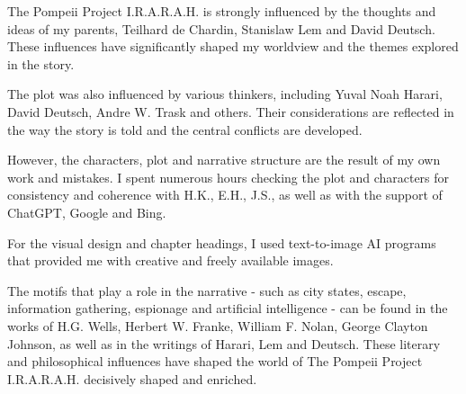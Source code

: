 \documentclass[
]{article}
\begin{document}
The Pompeii Project I.R.A.R.A.H. is strongly influenced by the thoughts
and ideas of my parents, Teilhard de Chardin, Stanislaw Lem and David
Deutsch. These influences have significantly shaped my worldview and the
themes explored in the story.

The plot was also influenced by various thinkers, including Yuval Noah
Harari, David Deutsch, Andre W. Trask and others. Their considerations
are reflected in the way the story is told and the central conflicts are
developed.

However, the characters, plot and narrative structure are the result of
my own work and mistakes. I spent numerous hours checking the plot and
characters for consistency and coherence with H.K., E.H., J.S., as well
as with the support of ChatGPT, Google and Bing.

For the visual design and chapter headings, I used text-to-image AI
programs that provided me with creative and freely available images.

The motifs that play a role in the narrative - such as city states,
escape, information gathering, espionage and artificial intelligence -
can be found in the works of H.G. Wells, Herbert W. Franke, William F.
Nolan, George Clayton Johnson, as well as in the writings of Harari, Lem
and Deutsch. These literary and philosophical influences have shaped the
world of The Pompeii Project I.R.A.R.A.H. decisively shaped and
enriched.
\end{document}
